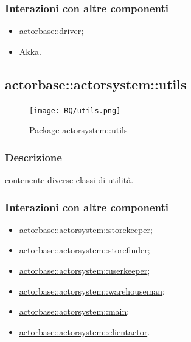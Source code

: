 \documentclass{scalatekids-article}
\begin{document}
\subsubsection{Interazioni con altre componenti}

\begin{itemize}
\item \hyperref[sec:actorbase::driver]{actorbase::driver};
\item Akka.
\end{itemize}


\subsection{actorbase::actorsystem::utils}
\label{sec:actorbase::actorsystem::utils}

\begin{figure}[H] %
  \begin{center}
    \texttt{[image: RQ/utils.png]}
    \caption{Package actorsystem::utils}
  \end{center}
\end{figure}

\subsubsection{Descrizione}
 contenente diverse classi di utilità.

\subsubsection{Interazioni con altre componenti}

\begin{itemize}
\item \hyperref[sec:actorbase::actorsystem::storekeeper]{actorbase::actorsystem::storekeeper};
\item \hyperref[sec:actorbase::actorsystem::storefinder]{actorbase::actorsystem::storefinder};
\item \hyperref[sec:actorbase::actorsystem::userkeeper]{actorbase::actorsystem::userkeeper};
\item \hyperref[sec:actorbase::actorsystem::warehouseman]{actorbase::actorsystem::warehouseman};
\item \hyperref[sec:actorbase::actorsystem::main]{actorbase::actorsystem::main};
\item \hyperref[sec:actorbase::actorsystem::clientactor]{actorbase::actorsystem::clientactor}.
\end{itemize}
\end{document}
